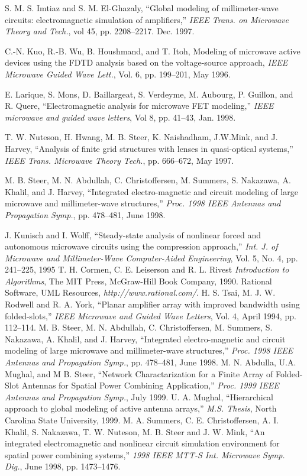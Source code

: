 \begin{thebibliography}{99}
 S. M. S. Imtiaz and S. M. El-Ghazaly, ``Global
modeling of millimeter-wave circuits: electromagnetic simulation of
amplifiers,'' \emph{IEEE Trans. on Microwave Theory and Tech.}, vol
45, pp. 2208--2217.  Dec. 1997.

 C.-N. Kuo, R.-B. Wu, B. Houshmand, and T. Itoh, Modeling
of microwave active devices using the FDTD analysis based on the
voltage-source approach, \emph{IEEE Microwave Guided Wave Lett.},
Vol. 6, pp. 199--201, May 1996.

 E. Larique, S. Mons, D. Baillargeat, S. Verdeyme,
M. Aubourg, P.  Guillon, and R. Quere, ``Electromagnetic analysis for
microwave FET modeling,'' \emph{IEEE microwave and guided wave
letters}, Vol 8, pp. 41--43, Jan. 1998.

 T. W. Nuteson, H. Hwang, M. B. Steer, K. Naishadham,
J.W.Mink, and J. Harvey, ``Analysis of finite grid structures with
lenses in quasi-optical systems,'' \emph{IEEE Trans. Microwave Theory
Tech.}, pp. 666--672, May 1997.

 M. B. Steer, M. N. Abdullah, C. Christoffersen,
M. Summers, S. Nakazawa, A. Khalil, and J. Harvey, ``Integrated
electro-magnetic and circuit modeling of large microwave and
millimeter-wave structures,'' \emph{Proc. 1998 IEEE Antennas and
Propagation Symp.}, pp. 478--481, June 1998.

 J. Kunisch and I. Wolff, ``Steady-state analysis of
nonlinear forced and autonomous microwave circuits using the
compression approach,'' \emph{Int. J. of Microwave and Millimeter-Wave
Computer-Aided Engineering}, Vol. 5, No. 4, pp. 241--225, 1995
%
 T. H. Cormen, C. E. Leiserson and R. L. Rivest
\emph{Introduction to Algorithms}, The MIT Press, McGraw-Hill Book
Company, 1990.
%
 Rational Software, UML Resources,
\emph{http://www.rational.com/}.
%
 H. S. Tsai, M. J. W. Rodwell and R. A. York,
``Planar amplifier array with improved bandwidth using folded-slots,''
\emph{IEEE Microwave and Guided Wave Letters}, Vol. 4, April 1994,
pp. 112--114.
%
 M. B. Steer, M. N. Abdullah,
C. Christoffersen, M. Summers, S. Nakazawa, A. Khalil, and J.  Harvey,
``Integrated electro-magnetic and circuit modeling of large microwave
and millimeter-wave structures,''
\emph{Proc. 1998 IEEE Antennas and Propagation Symp.},
pp. 478--481, June 1998.
%
 M. N. Abdulla, U.A. Mughal, and M B. Steer,
``Network Charactarization for a Finite Array of Folded-Slot Antennas
for Spatial Power Combining Application,''
\emph{Proc. 1999 IEEE Antennas and Propagation Symp.},
July 1999.
%
 U. A. Mughal, ``Hierarchical approach to global
modeling of active antenna arrays,'' \emph{M.S. Thesis}, North
Carolina State University, 1999.
%
 M. A. Summers, C. E. Christoffersen, A. I. Khalil,
S. Nakazawa, T. W. Nuteson, M. B. Steer and J. W. Mink, ``An
integrated electromagnetic and nonlinear circuit simulation
environment for spatial power combining systems,'' \emph{1998 IEEE
MTT-S Int. Microwave Symp. Dig.}, June 1998, pp. 1473--1476.


\end{thebibliography}

